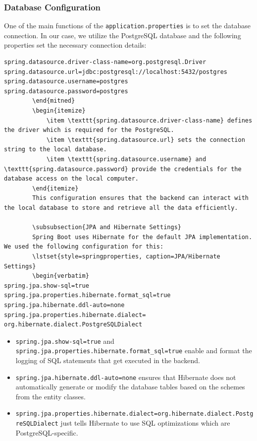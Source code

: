         \subsubsection{Database Configuration}
        One of the main functions of the \texttt{application.properties} is to set the database connection. In our case, we utilize the PostgreSQL database and the following properties set the necessary connection details:
        \lstset{style=springproperties, caption=Database Configuration}
        \begin{verbatim}
spring.datasource.driver-class-name=org.postgresql.Driver
spring.datasource.url=jdbc:postgresql://localhost:5432/postgres
spring.datasource.username=postgres
spring.datasource.password=postgres
        \end{mitned}
        \begin{itemize}
            \item \texttt{spring.datasource.driver-class-name} defines the driver which is required for the PostgreSQL.
            \item \texttt{spring.datasource.url} sets the connection string to the local database.
            \item \texttt{spring.datasource.username} and \texttt{spring.datasource.password} provide the credentials for the database access on the local computer.
        \end{itemize}
        This configuration ensures that the backend can interact with the local database to store and retrieve all the data efficiently.

        \subsubsection{JPA and Hibernate Settings}
        Spring Boot uses Hibernate for the default JPA implementation. We used the following configuration for this:
        \lstset{style=springproperties, caption=JPA/Hibernate Settings}
        \begin{verbatim}
spring.jpa.show-sql=true
spring.jpa.properties.hibernate.format_sql=true
spring.jpa.hibernate.ddl-auto=none
spring.jpa.properties.hibernate.dialect= org.hibernate.dialect.PostgreSQLDialect
        \end{verbatim} 

        \begin{itemize}
            \item \texttt{spring.jpa.show-sql=true} and \newline \texttt{spring.jpa.properties.hibernate.format\_sql=true} enable and format the logging of SQL statements that get executed in the backend.
            \item \texttt{spring.jpa.hibernate.ddl-auto=none} ensures that Hibernate does not automatically generate or modify the database tables based on the schemes from the entity classes.
            \item \texttt{spring.jpa.properties.hibernate.dialect=org.hibernate.dialect.PostgreSQLDialect} just tells Hibernate to use SQL optimizations which are PostgreSQL-specific.
        \end{itemize}
        
